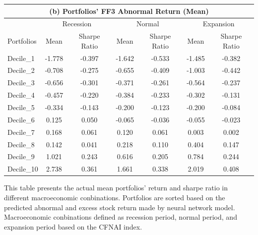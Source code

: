 \begin{table}[H]
\begin{tabular}{l|cc|cc|cc}
      \multicolumn{7}{c}{(b) Portfolios' FF3 Abnormal Return (Mean)}\\\hline
      ~ & \multicolumn{2}{c}{Recession} & \multicolumn{2}{c}{Normal} & \multicolumn{2}{c}{Expansion} \\ \cline{2-7}
      Portfolios & Mean & Sharpe Ratio & Mean & Sharpe Ratio & Mean & Sharpe Ratio \\ \hline
      Decile\_1 & -1.778 & -0.397 & -1.642 & -0.533 & -1.485 & -0.382 \\ 
      Decile\_2 & -0.708 & -0.275 & -0.655 & -0.409 & -1.003 & -0.442 \\ 
      Decile\_3 & -0.656 & -0.301 & -0.371 & -0.261 & -0.564 & -0.237 \\ 
      Decile\_4 & -0.457 & -0.220 & -0.384 & -0.233 & -0.302 & -0.131 \\ 
      Decile\_5 & -0.334 & -0.143 & -0.200 & -0.123 & -0.200 & -0.084 \\ 
      Decile\_6 & 0.125 & 0.050 & -0.065 & -0.036 & -0.055 & -0.023 \\ 
      Decile\_7 & 0.168 & 0.061 & 0.120 & 0.061 & 0.003 & 0.002 \\ 
      Decile\_8 & 0.142 & 0.041 & 0.218 & 0.110 & 0.404 & 0.147 \\ 
      Decile\_9 & 1.021 & 0.243 & 0.616 & 0.205 & 0.784 & 0.244 \\ 
      Decile\_10 & 2.738 & 0.361 & 1.661 & 0.338 & 2.019 & 0.408 \\  \hline
  \end{tabular}
  \label{table: portfolio ret in tertiles rest}
  \begin{tablenotes}
    \footnotesize
    \item This table presents the actual mean portfolios' return and sharpe ratio in different macroeconomic conbinations. Portfolios are sorted based on the predicted abnormal and excess stock return made by neural network model. Macroeconomic conbinations defined as recession period, normal period, and expansion period based on the CFNAI index.
  \end{tablenotes}
\end{table}